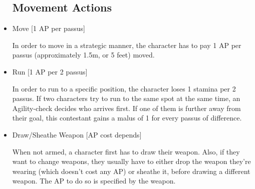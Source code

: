 \begin{itemize}
\subsection{Movement Actions}

\item Move [1 AP per passus]

In order to move in a strategic manner, the character has to pay 1 AP per passus (approximately 1.5m, or 5 feet) moved. 



\item Run [1 AP per 2 passus]

In order to run to a specific position, the character loses 1 stamina per 2 passus. If two characters try to run to the same spot at the same time, an Agility-check decides who arrives first. If one of them is further away from their goal, this contestant gains a malus of 1 for every passus of difference.


\item Draw/Sheathe Weapon  [AP cost depends]

When not armed, a character first has to draw their weapon. Also, if they want to change weapons, they usually have to either drop the weapon they're wearing (which doesn't cost any AP) or sheathe it, before drawing a different weapon. The AP to do so is specified by the weapon.


\end{itemize}